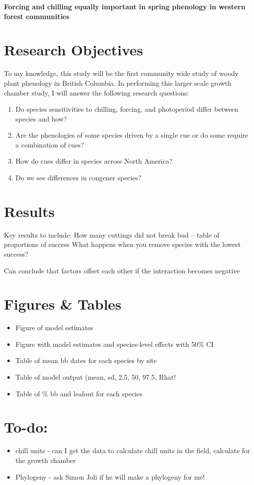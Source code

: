 \documentclass[11pt,letter]{article}
\begin{document}
%
\renewcommand{\refname}{\CHead{}}

{\bf Forcing and chilling equally important in spring phenology in western forest communities}\\ 

\section{Research Objectives}
To my knowledge, this study will be the first community wide study of woody plant phenology in British Columbia. In performing this larger scale growth chamber study, I will answer the following research questions:
\begin{enumerate}
\item Do species sensitivities to chilling, forcing, and photoperiod differ between species and how?
\item Are the phenologies of some species driven by a single cue or do some require a combination of cues?
\item How do cues differ in species across North America? 
\item Do we see differences in congener species? 
\end{enumerate}

\section{Results}

Key results to include:
How many cuttings did not break bud -- table of proportions of success
What happens when you remove species with the lowest success?

Can conclude that factors offset each other if the interaction becomes negative



\section{Figures \& Tables}

\begin{itemize}
\item Figure of model estimates
\item Figure with model estimates and species-level effects with 50\% CI
\item Table of mean bb dates for each species by site
\item Table of model output (mean, sd, 2.5, 50, 97.5, Rhat! 
\item Table of \% bb and leafout for each species
\end{itemize}

\section{To-do:}
\begin{itemize}
\item chill units - can I get the data to calculate chill units in the field, calculate for the growth chamber
\item Phylogeny - ask Simon Joli if he will make a phylogeny for me!
\end{itemize}
\end{document}
